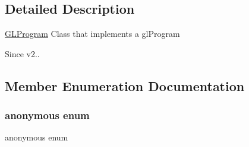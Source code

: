 \subsection{Detailed Description}
\hyperlink{classGLProgram}{G\+L\+Program} Class that implements a gl\+Program

\begin{DoxySince}{Since}
v2.. 
\end{DoxySince}


\subsection{Member Enumeration Documentation}
\mbox{\label{classGLProgram_aafc660d342bb6478b32651459efb4189}} 
\subsubsection{\texorpdfstring{anonymous enum}{anonymous enum}}
{\footnotesize\ttfamily anonymous enum}

